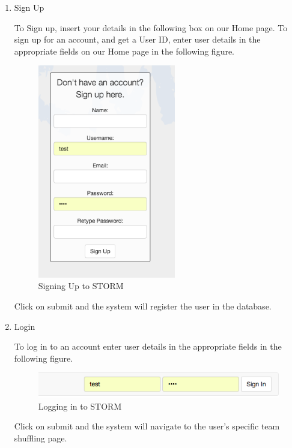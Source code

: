 \begin{enumerate}
\item Sign Up\par

To Sign up, insert your details in the following box on our Home page.
To sign up for an account, and get a User ID, enter user details in the appropriate fields on our Home page in the following figure.\par

 \begin{figure}[H] 
	\centering
	\includegraphics[width=6cm]{./graphics/StormUMSU1.jpg}\par
	\caption{Signing Up to STORM}
\end{figure}
Click on submit and the system will register the user in the database.

\item Login\par
To log in to an account enter user details in the appropriate fields in the following figure.\par
 \begin{figure}[H] 
	\centering
	\includegraphics[width=13cm]{./graphics/StormUMSU2.jpg}\par
	\caption{Logging in to STORM}
\end{figure}
Click on submit and the system will navigate to the user's specific team shuffling page.


\end{enumerate}
